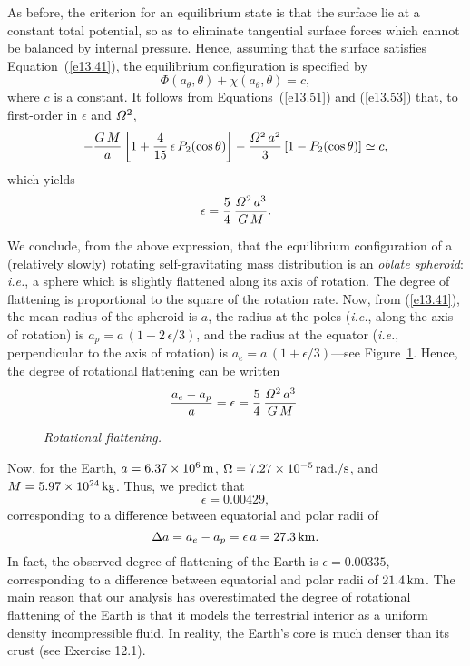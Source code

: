 As before, the criterion for an equilibrium state is that the surface lie at
a constant total potential, so as to eliminate tangential surface forces which
cannot be balanced by internal pressure. Hence, assuming that the
surface satisfies Equation~(\ref{e13.41}), the equilibrium configuration is specified by
\begin{equation}
\Phi(a_\theta,\theta)+\chi(a_\theta,\theta) = c,
\end{equation}
where $c$ is a constant. It follows from Equations~(\ref{e13.51}) and (\ref{e13.53}) that, to first-order in $\epsilon$ and ${\mit\Omega}^2$,
\begin{equation}
- \frac{G\,M}{a} \left[1+ \frac{4}{15}\,\epsilon\,P_2(\cos\theta)\right]
-\frac{\mit\Omega^2\,a^2}{3}\left[1-P_2(\cos\theta)\right]\simeq c,
\end{equation}
which yields
\begin{equation}
\epsilon =  \frac{5}{4}\,\frac{{\mit\Omega}^2\,a^3}{G\,M}.
\end{equation}

We conclude, from the above expression, that the equilibrium configuration
of a (relatively slowly) rotating self-gravitating mass distribution is an {\em oblate spheroid}: {\em i.e.}, a sphere
which is slightly flattened along its axis of rotation. The degree of flattening is proportional
to the square of the rotation rate. Now, from (\ref{e13.41}), the mean radius 
of the spheroid is
$a$, the radius at the poles ({\em i.e.}, along the axis of rotation) is $a_p=a\,(1-2\,\epsilon/3)$, and the radius at the
equator ({\em i.e.}, perpendicular to the axis of rotation) is $a_e = a\,(1+\epsilon/3)$---see Figure~\ref{frotn}. Hence, the degree of rotational flattening
can be written
\begin{equation}
\frac{a_e-a_p}{a} = \epsilon = \frac{5}{4}\,\frac{{\mit\Omega}^2\,a^3}{G\,M}.
\end{equation}
\begin{figure}
\epsfysize=2.25in
\centerline{}
\caption{\em Rotational flattening.}\label{frotn}
\end{figure}

Now, for the Earth, $a=6.37\times 10^6\,{\rm m}$, $\Omega = 7.27\times 10^{-5}\,{\rm rad./s}$, and $M = 5.97\times 10^{24}\,{\rm kg}$. 
Thus, we predict that
\begin{equation}
\epsilon = 0.00429,
\end{equation}
corresponding to a difference between equatorial and polar radii
of
\begin{equation}
\Delta a = a_e-a_p = \epsilon\,a = 27.3\,{\rm km}.
\end{equation}
In fact, the observed degree of flattening of the Earth is $\epsilon=0.00335$,
corresponding to a difference between equatorial and polar radii
of $21.4\,{\rm km}$. The main reason that our analysis has overestimated the
degree of rotational flattening of the Earth is that it models the terrestrial interior as a uniform density incompressible fluid. In reality,
the Earth's core is much denser than its crust (see Exercise 12.1). 

